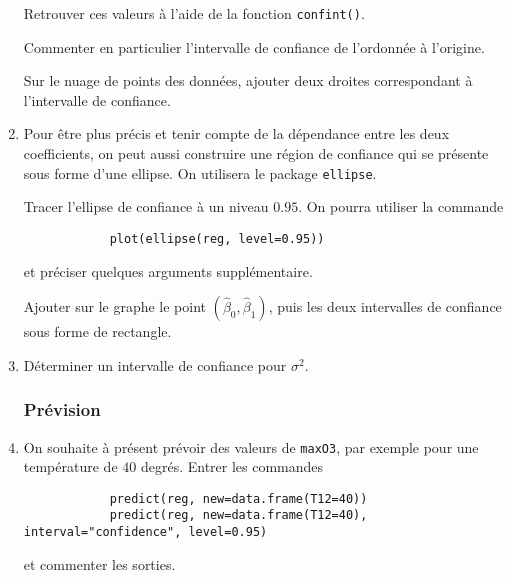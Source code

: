 \documentclass{../../TD/td_um}
\providecommand{\1}{\mathds{1}}
\begin{document}
\begin{enumerate}
		Retrouver ces valeurs à l'aide de la fonction \texttt{confint()}.
	
		Commenter en particulier l'intervalle de confiance de l'ordonnée à l'origine.
		
		Sur le nuage de points des données, ajouter deux droites correspondant à l'intervalle de confiance.
	
		\item Pour être plus précis et tenir compte de la dépendance entre les deux coefficients, on peut aussi construire une région de confiance qui se présente sous forme d'une ellipse. On utilisera le package \texttt{ellipse}.
		
		Tracer l'ellipse de confiance à un niveau $0.95$. On pourra utiliser la commande
		\begin{verbatim}
			plot(ellipse(reg, level=0.95))
		\end{verbatim}
		et préciser quelques arguments supplémentaire.
		
		Ajouter sur le graphe le point $(\hat \beta_0, \hat \beta_1)$, puis les deux intervalles de confiance sous forme de rectangle.
		
		\item Déterminer un intervalle de confiance pour $\sigma^2$.
	
	
	\subsubsection*{Prévision}
		\item On souhaite à présent prévoir des valeurs de \texttt{maxO3}, par exemple pour une température de $40$ degrés. Entrer les commandes
		\begin{verbatim}
			predict(reg, new=data.frame(T12=40))
			predict(reg, new=data.frame(T12=40), interval="confidence", level=0.95)
		\end{verbatim}
		et commenter les sorties.
		

\end{enumerate}
\end{document}
